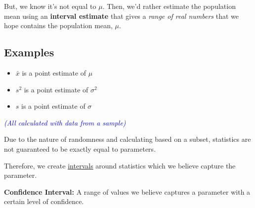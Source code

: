 \vspace{1em}

But, we know it’s not equal to $\mu$. Then, we’d rather estimate the population mean using an \textbf{interval estimate} that gives a \textit{range of real numbers} that we hope contains the population mean, $\mu$.
\vspace{2em}
\textcolor{orange!80!black}{\section*{Examples}}

\begin{itemize}
    \item $\bar{x}$ is a point estimate of $\mu$
    \item $s^2$ is a point estimate of $\sigma^2$
    \item $s$ is a point estimate of $\sigma$
\end{itemize}

\vspace{0.5em}
\textcolor{blue}{\textit{(All calculated with data from a sample)}}

\vspace{1.5em}

Due to the nature of randomness and calculating based on a subset, statistics are not guaranteed to be exactly equal to parameters.

\vspace{1em}

Therefore, we create \underline{intervals} around statistics which we believe capture the parameter.

\vspace{2em}

\noindent
\textbf{Confidence Interval:} A range of values we believe captures a parameter with a certain level of confidence.

\vspace{1em}

\begin{center}
\end{center}

